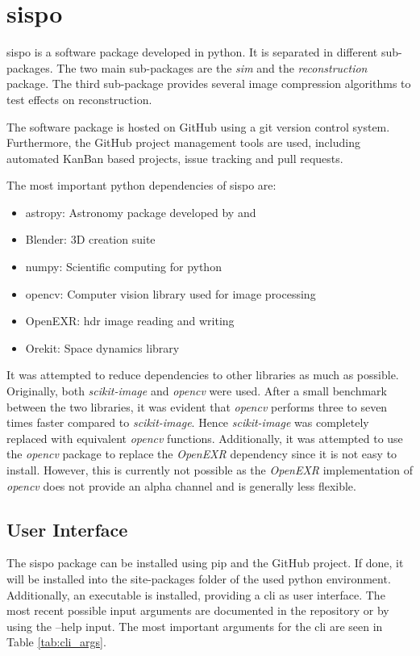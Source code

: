 \section{\Acrlong{sispo}}

\gls{sispo} is a software package developed in python. It is separated in different sub-packages. The two main sub-packages are the \textit{sim} and the \textit{reconstruction} package. The third sub-package provides several image compression algorithms to test effects on reconstruction.

The software package is hosted on GitHub using a git version control system. Furthermore, the GitHub project management tools are used, including automated KanBan based projects, issue tracking and pull requests.

The most important python dependencies of \gls{sispo} are:
\begin{itemize}
    \item astropy: Astronomy package developed by \cite{robitaille2013astropy} and \cite{price2018astropy}
    \item Blender: 3D creation suite
    \item numpy: Scientific computing for python
    \item opencv: Computer vision library used for image processing
    \item OpenEXR: \gls{hdr} image reading and writing
    \item Orekit: Space dynamics library
\end{itemize}

It was attempted to reduce dependencies to other libraries as much as possible. Originally, both \textit{scikit-image} and \textit{opencv} were used. After a small benchmark between the two libraries, it was evident that \textit{opencv} performs three to seven times faster compared to \textit{scikit-image}. Hence \textit{scikit-image} was completely replaced with equivalent \textit{opencv} functions. Additionally, it was attempted to use the \textit{opencv} package to replace the \textit{OpenEXR} dependency since it is not easy to install. However, this is currently not possible as the \textit{OpenEXR} implementation of \textit{opencv} does not provide an alpha channel and is generally less flexible.

\subsection{User Interface}
The sispo package can be installed using pip and the GitHub project. If done, it will be installed into the site-packages folder of the used python environment. Additionally, an executable is installed, providing a \gls{cli} as user interface. The most recent possible input arguments are documented in the repository or by using the --help input. The most important arguments for the \gls{cli} are seen in Table \ref{tab:cli_args}.

